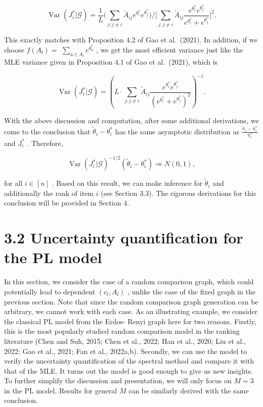 \[
\operatorname {Var}(J_i^* |\mathcal{G}) = \frac{1}{L}\bigg(\sum_{j:j\neq i}\widetilde{A}_{ij}e^{\theta_i^*}e^{\theta_j^*}\bigg)\bigg / \bigg[\sum_{j:j\neq i}\widetilde{A}_{ij}\frac{e^{\theta_i^*}e^{\theta_j^*}}{e^{\theta_i^*} + e^{\theta_j^*}}\bigg]^2.
\]

This exactly matches with Proposition 4.2 of Gao et al.~(2021). In
addition, if we choose \(f(A_{l}) =\)
\(\textstyle \sum_{u\in A_l}e^{\theta_u^*}\) , we get the most efficient
variance just like the MLE variance given in Proposition 4.1 of Gao et
al.~(2021), which is

\[
\operatorname {Var}(J_i^* |\mathcal{G}) = \left(L\cdot \sum_{j:j\neq i}\widetilde{A}_{ij}\frac{e^{\theta_i^*}e^{\theta_j^*}}{(e^{\theta_i^*} + e^{\theta_j^*})^2}\right)^{-1}.
\]

With the above discussion and computation, after some additional
derivations, we come to the conclusion that
\(\widetilde{\theta}_{i} - \theta_{i}^{*}\) has the same asymptotic
distribution as
\(\frac{\widetilde{\pi}_{i} - \pi_{i}^{*}}{\pi_{i}^{*}}\) and
\(J_{i}^{*}\) . Therefore,

\[
\operatorname {Var}(J_i^* |\mathcal{G})^{-1 / 2}(\widetilde{\theta}_i - \theta_i^*)\Rightarrow N(0,1),
\]

for all \(i\in [n]\) . Based on this result, we can make inference for
\(\widetilde{\theta}_{i}\) and additionally the rank of item \(i\) (see
Section 3.3). The rigorous derivations for this conclusion will be
provided in Section 4.

\section{3.2 Uncertainty quantification for the PL
model}\label{uncertainty-quantification-for-the-pl-model}

In this section, we consider the case of a random comparison graph,
which could potentially lead to dependent \((c_l,A_l)\) , unlike the
case of the fixed graph in the previous section. Note that since the
random comparison graph generation can be arbitrary, we cannot work with
each case. As an illustrating example, we consider the classical PL
model from the Erdos- Renyi graph here for two reasons. Firstly, this is
the most popularly studied random comparison model in the ranking
literature (Chen and Suh, 2015; Chen et al., 2022; Han et al., 2020; Liu
et al., 2022; Gao et al., 2021; Fan et al., 2022a,b). Secondly, we can
use the model to verify the uncertainty quantification of the spectral
method and compare it with that of the MLE. It turns out the model is
good enough to give us new insights. To further simplify the discussion
and presentation, we will only focus on \(M = 3\) in the PL model.
Results for general \(M\) can be similarly derived with the same
conclusion.

